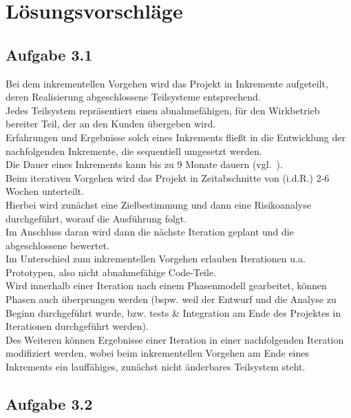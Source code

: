 \section{Lösungsvorschläge}

\subsection{Aufgabe 3.1}

Bei dem inkrementellen Vorgehen wird das Projekt in Inkremente aufgeteilt, deren Realisierung abgeschlossene Teilsysteme entsprechend.\\
Jedes Teilsystem repräsentiert einen abnahmefähigen, für den Wirkbetrieb bereiter Teil, der an den Kunden übergeben wird.\\
Erfahrungen und Ergebnisse solch eines Inkrements fließt in die Entwicklung der nachfolgenden Inkremente, die sequentiell umgesetzt werden.\\
Die Dauer eines Inkrements kann bis zu 9 Monate dauern (vgl.~\cite[84]{Wed09}).\\

\noindent
Beim iterativen Vorgehen wird das Projekt in Zeitabschnitte von (i.d.R.) 2-6 Wochen unterteilt.\\
Hierbei wird zunächst eine Zielbestimmung und dann eine Risikoanalyse durchgeführt, worauf die Ausführung folgt.\\
Im Anschluss daran wird dann die nächste Iteration geplant und die abgeschlossene bewertet.\\

\noindent
Im Unterschied zum inkrementellen Vorgehen erlauben Iterationen u.a. Prototypen, also nicht abnahmefähige Code-Teile. \\
Wird innerhalb einer Iteration nach einem Phasenmodell gearbeitet, können Phasen auch überprungen werden (bspw. weil der Entwurf und die Analyse zu Beginn durchgeführt wurde, bzw. tests \& Integration am Ende des Projektes in Iterationen durchgeführt werden).\\

\noindent
Des Weiteren können Ergebnisse einer Iteration in einer nachfolgenden Iteration modifiziert werden, wobei beim inkrementellen Vorgehen am Ende eines Inkrements ein lauffähiges, zunächst nicht änderbares Teilsystem steht.

\subsection{Aufgabe 3.2}

